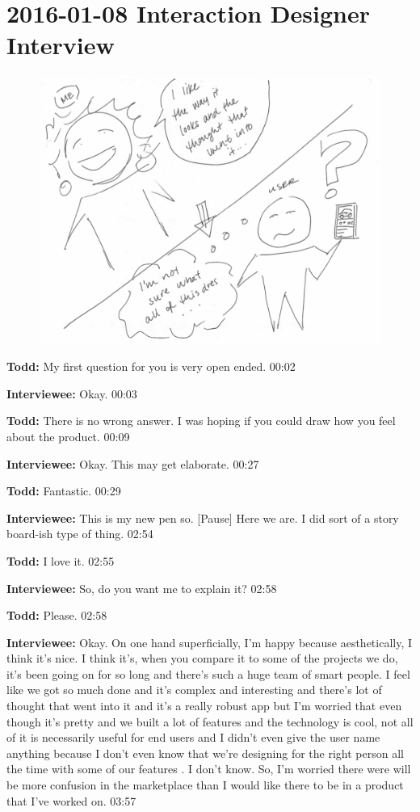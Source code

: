 \section{2016-01-08 Interaction Designer Interview}

\begin{figure}[h]
\centering
\includegraphics[width=6.5in]{interviews/2016_01_08.png}
\caption{}
\label{2016_01_08}
\end{figure}

\textbf{Todd:} My first question for you is very open ended.  00:02

\textbf{Interviewee:} Okay.  00:03

\textbf{Todd:} There is no wrong answer.  I was hoping if you could draw how you feel about the product.  00:09

\textbf{Interviewee:} Okay.  This may get elaborate.  00:27

\textbf{Todd:} Fantastic.  00:29

\textbf{Interviewee:} This is my new pen so.  [Pause] Here we are.  I did sort of a story board-ish type of thing.  02:54

\textbf{Todd:} I love it.  02:55

\textbf{Interviewee:} So, do you want me to explain it?  02:58

\textbf{Todd:} Please.  02:58

\textbf{Interviewee:} Okay.  On one hand superficially, I'm happy because aesthetically, I think it's nice.  I think it's, when you compare it to some of the projects we do, it's been going on for so long and there's such a huge team of smart people.  I feel like we got so much done and it's complex and interesting and there's lot of thought that went into it and it's a really robust app but I'm worried that even though it's pretty and we built a lot of features and the technology is cool, not all of it is necessarily useful for end users and I didn't even give the user name anything because I don't even know that we're designing for the right person all the time with some of our features .  I don't know.  So, I'm worried there were will be more confusion in the marketplace than I would like there to be in a product that I've worked on.  03:57

